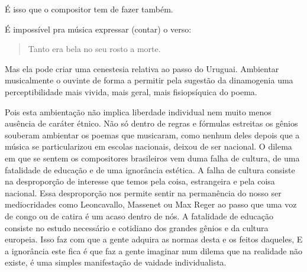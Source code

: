 É isso que o compositor tem de fazer também.

É impossível pra música expressar (contar) o verso:

\begin{verse}
Tanto era bela no seu rosto a morte.
\end{verse}

Mas ela pode criar uma cenestesia relativa ao passo do Uruguai.
Ambientar musicalmente o ouvinte de forma a permitir pela sugestão da
dinamogenia uma perceptibilidade mais vivida, mais geral, mais
fisiopsíquica do poema.

Pois esta ambientação não implica liberdade individual nem muito menos
ausência de caráter étnico. Não só dentro de regras e fórmulas estreitas
os gênios souberam ambientar os poemas que musicaram, como nenhum deles
depois que a música se particularizou em escolas nacionais, deixou de
ser nacional. O dilema em que se sentem os compositores brasileiros vem
duma falha de cultura, de uma fatalidade de educação e de uma ignorância
estética. A falha de cultura consiste na desproporção de interesse que
temos pela coisa, estrangeira e pela coisa nacional. Essa desproporção
nos permite sentir na permanência do nosso ser mediocridades como
Leoncavallo, Massenet ou Max Reger ao passo que uma voz de congo ou de
catira é um acaso dentro de nós. A fatalidade de
educação consiste no estudo necessário e cotidiano dos grandes gênios e
da cultura europeia. Isso faz com que a gente adquira as normas desta e
os feitos daqueles, E a ignorância este fica é que faz a gente imaginar
num dilema que na realidade não existe, é uma simples manifestação de
vaidade individualista.

